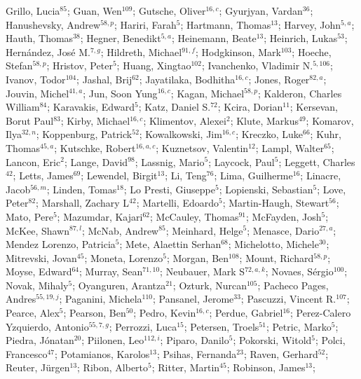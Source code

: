 Grillo, Lucia$^{85}$;
Guan, Wen$^{109}$;
Gutsche, Oliver$^{16,c}$;
Gyurjyan, Vardan$^{36}$;
Hanushevsky, Andrew$^{58,p}$;
Hariri, Farah$^{5}$;
Hartmann, Thomas$^{13}$;
Harvey, John$^{5,a}$;
Hauth, Thomas$^{38}$;
Hegner, Benedikt$^{5,a}$;
Heinemann, Beate$^{13}$;
Heinrich, Lukas$^{53}$;
Hernández, José M.$^{7,g}$;
Hildreth, Michael$^{91,f}$;
Hodgkinson, Mark$^{103}$;
Hoeche, Stefan$^{58,p}$;
Hristov, Peter$^{5}$;
Huang, Xingtao$^{102}$;
Ivanchenko, Vladimir N.$^{5,106}$;
Ivanov, Todor$^{104}$;
Jashal, Brij$^{62}$;
Jayatilaka, Bodhitha$^{16,c}$;
Jones, Roger$^{82,a}$;
Jouvin, Michel$^{41,a}$;
Jun, Soon Yung$^{16,c}$;
Kagan, Michael$^{58,p}$;
Kalderon, Charles William$^{84}$;
Karavakis, Edward$^{5}$;
Katz, Daniel S.$^{72}$;
Kcira, Dorian$^{11}$;
Kersevan, Borut Paul$^{83}$;
Kirby, Michael$^{16,c}$;
Klimentov, Alexei$^{2}$;
Klute, Markus$^{49}$;
Komarov, Ilya$^{32,n}$;
Koppenburg, Patrick$^{52}$;
Kowalkowski, Jim$^{16,c}$;
Kreczko, Luke$^{66}$;
Kuhr, Thomas$^{45,a}$;
Kutschke, Robert$^{16,a,c}$;
Kuznetsov, Valentin$^{12}$;
Lampl, Walter$^{65}$;
Lancon, Eric$^{2}$;
Lange, David$^{98}$;
Lassnig, Mario$^{5}$;
Laycock, Paul$^{5}$;
Leggett, Charles$^{42}$;
Letts, James$^{69}$;
Lewendel, Birgit$^{13}$;
Li, Teng$^{76}$;
Lima, Guilherme$^{16}$;
Linacre, Jacob$^{56,m}$;
Linden, Tomas$^{18}$;
Lo Presti, Giuseppe$^{5}$;
Lopienski, Sebastian$^{5}$;
Love, Peter$^{82}$;
Marshall, Zachary L$^{42}$;
Martelli, Edoardo$^{5}$;
Martin-Haugh, Stewart$^{56}$;
Mato, Pere$^{5}$;
Mazumdar, Kajari$^{62}$;
McCauley, Thomas$^{91}$;
McFayden, Josh$^{5}$;
McKee, Shawn$^{87,l}$;
McNab, Andrew$^{85}$;
Meinhard, Helge$^{5}$;
Menasce, Dario$^{27,a}$;
Mendez Lorenzo, Patricia$^{5}$;
Mete, Alaettin Serhan$^{68}$;
Michelotto, Michele$^{30}$;
Mitrevski, Jovan$^{45}$;
Moneta, Lorenzo$^{5}$;
Morgan, Ben$^{108}$;
Mount, Richard$^{58,p}$;
Moyse, Edward$^{64}$;
Murray, Sean$^{71,10}$;
Neubauer, Mark S$^{72,a,k}$;
Novaes, Sérgio$^{100}$;
Novak, Mihaly$^{5}$;
Oyanguren, Arantza$^{21}$;
Ozturk, Nurcan$^{105}$;
Pacheco Pages, Andres$^{55,19,j}$;
Paganini, Michela$^{110}$;
Pansanel, Jerome$^{33}$;
Pascuzzi, Vincent R.$^{107}$;
Pearce, Alex$^{5}$;
Pearson, Ben$^{50}$;
Pedro, Kevin$^{16,c}$;
Perdue, Gabriel$^{16}$;
Perez-Calero Yzquierdo, Antonio$^{55,7,g}$;
Perrozzi, Luca$^{15}$;
Petersen, Troels$^{51}$;
Petric, Marko$^{5}$;
Piedra, Jónatan$^{20}$;
Piilonen, Leo$^{112,i}$;
Piparo, Danilo$^{5}$;
Pokorski, Witold$^{5}$;
Polci, Francesco$^{47}$;
Potamianos, Karolos$^{13}$;
Psihas, Fernanda$^{23}$;
Raven, Gerhard$^{52}$;
Reuter, Jürgen$^{13}$;
Ribon, Alberto$^{5}$;
Ritter, Martin$^{45}$;
Robinson, James$^{13}$;

